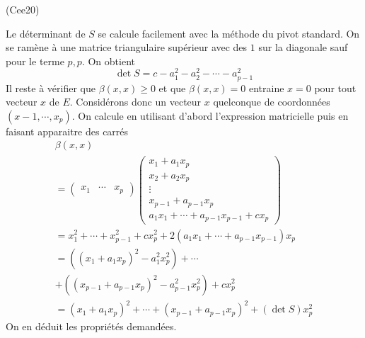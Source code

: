 \begin{tiny}(Cee20)\end{tiny} Le déterminant de $S$ se calcule facilement avec la méthode du pivot standard. On se ramène à une matrice triangulaire supérieur avec des $1$ sur la diagonale sauf pour le terme $p,p$. On obtient
\begin{displaymath}
 \det S = c -a_1^2 - a_2^2 - \cdots - a_{p-1}^2
\end{displaymath}
Il reste à vérifier que $\beta(x,x)\geq 0$ et que $\beta(x,x)=0$ entraine $x=0$ pour tout vecteur $x$ de $E$.\newline
Considérons donc un vecteur $x$ quelconque de coordonnées $(x-1,\cdots,x_p)$. On calcule en utilisant d'abord l'expression matricielle puis en faisant apparaitre des carrés
\begin{multline*}
 \beta(x,x)\\
=
\begin{pmatrix}
 x_1 & \cdots & x_p
\end{pmatrix}
\begin{pmatrix}
 x_1+a_1 x_p \\ x_2+a_2 x_p \\ \vdots \\ x_{p-1}+a_{p-1} x_p \\
a_1x_1+\cdots+a_{p-1}x_{p-1} +cx_p  
\end{pmatrix}
\\
=x_1^2+\cdots + x_{p-1}^2 + cx_p^2 +
2\left( a_1x_1+\cdots+a_{p-1}x_{p-1} \right) x_p\\
=\left((x_1 + a_1x_p)^2-a_1^2x_p^2 \right) + \cdots  \\+ \left((x_{p-1} + a_{p-1}x_p)^2-a_{p-1}^2x_p^2 \right) + cx_p^2\\
= (x_1 + a_1x_p)^2 + \cdots +(x_{p-1} + a_{p-1}x_p)^2+ (\det S )x_p^2
\end{multline*}
On en déduit les propriétés demandées.  